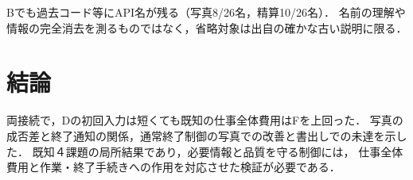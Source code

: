 \documentclass[uplatex,a4paper,twocolumn,10pt]{jsarticle}
\begin{document}
Bでも過去コード等にAPI名が残る（写真8/26名，精算10/26名）．
名前の理解や情報の完全消去を測るものではなく，省略対象は出自の確かな古い説明に限る．

\section{結論}
両接続で，Dの初回入力は短くても既知の仕事全体費用はFを上回った．
写真の成否差と終了通知の関係，通常終了制御の写真での改善と書出しでの未達を示した．
既知４課題の局所結果であり，必要情報と品質を守る制御には，
仕事全体費用と作業・終了手続きへの作用を対応させた検証が必要である．



\end{document}
